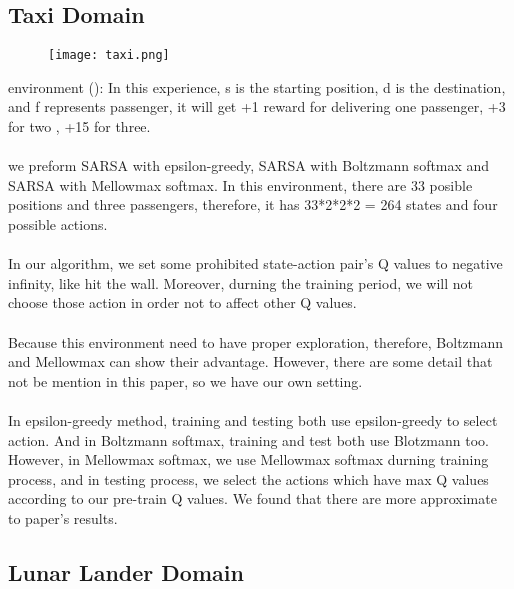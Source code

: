 \subsection{Taxi Domain}

\begin{figure}[H]
\texttt{[image: taxi.png]}
\end{figure}

environment (\cite{dearden1998bayesian}):
In this experience, s is the starting position, d is the destination, and f represents passenger, it will get +1 reward for delivering one passenger, +3 for two , +15 for three.
\\
\\
we preform SARSA with epsilon-greedy, SARSA with Boltzmann softmax and SARSA with Mellowmax softmax. In this environment, there are 33 posible positions and three passengers, therefore, it has 33*2*2*2 = 264 states and four possible actions.
\\
\\
In our algorithm, we set some prohibited state-action pair's Q values to negative infinity, like hit the wall. Moreover, durning the training period, we will not choose those action in order not to affect other Q values.
\\
\\
Because this environment need to have proper exploration, therefore, Boltzmann and Mellowmax can show their advantage. However, there are some detail that not be mention in this paper, so we have our own setting.
\\
\\
In epsilon-greedy method, training and testing both use epsilon-greedy to select action. And in Boltzmann softmax, training and test both use Blotzmann too. However, in Mellowmax softmax, we use Mellowmax softmax durning training process, and in testing process, we select the actions which have max Q values according to our pre-train Q values. We found that there are more approximate to paper's results.

\subsection{Lunar Lander Domain}

